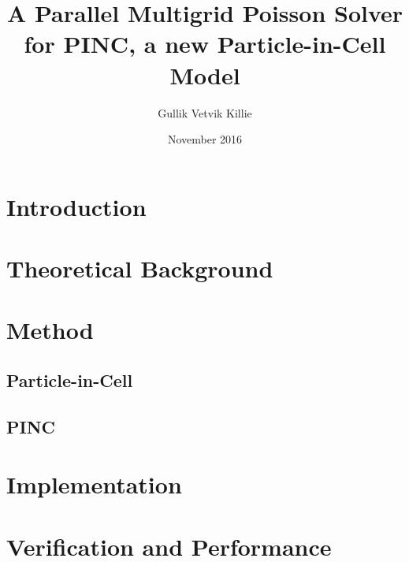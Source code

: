 \documentclass[x11names,twoside,english]{uiofysmaster}
\author{Gullik Vetvik Killie}
\title{A Parallel Multigrid Poisson Solver for PINC, a new Particle-in-Cell
    Model}
\date{November 2016}
\begin{document}
\maketitle



%
\tableofcontents

\chapter{Introduction}
    

\chapter{Theoretical Background}
	\label{sec:theory}
    
    
    
    
    
    
    
%
\chapter{Method}
	\label{sec:Method}
    
	\section{Particle-in-Cell}
    
    
	\section{PINC}
	
    
    
    
    
    

\chapter{Implementation}
	\label{sec:impl}
    
    
    
    

\chapter{Verification and Performance}
	\label{sec:ver_perf}
\end{document}
